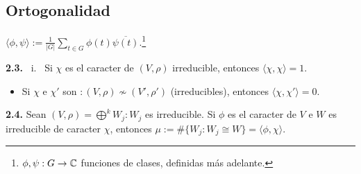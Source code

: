 
\subsection*{Ortogonalidad}

\begin{definition}
    \centering   \(\displaystyle \langle \phi,\psi\rangle := \frac{1}{|G|} \sum_{t\in G}\phi(t) \overline{\psi(t)} \).\footnote{\(\phi, \psi : G \to \mathbb{C}\) funciones de clases, definidas más adelante.}%
\end{definition}


\hypertarget{thm23}{}
\begin{theorem}
    \textbf{2.3.} \ i. \ Si \(\chi \) es el caracter de \((V,\rho)\) irreducible, entonces \(\langle \chi, \chi\rangle  = 1 \). 
    \vspace{-0.3cm}
    \begin{itemize}[left = 1cm]
        \item[ii.] Si \(\chi\) e \(\chi'\) son \(: (V,\rho)\nsim(V', \rho') \) (irreducibles), entonces \(\langle \chi, \chi'\rangle = 0\).  
    \end{itemize}
\end{theorem}


\begin{theorem}
    \textbf{2.4.} Sean \((V,\rho) = \bigoplus^k W_j : W_j\) es irreducible. Si \(\phi\) es el caracter de \(V\) e \(W\) es irreducible de caracter \(\chi\), entonces \(\mu:= \#\{W_j : W_j \cong W\} = \langle \phi, \chi\rangle\). 
\end{theorem}

